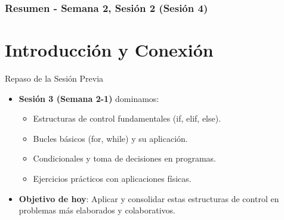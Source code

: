 \documentclass[10pt]{beamer}
\begin{document}
\myfront{}

\begin{frame}[plain]
  \titlepage
\end{frame}

\begin{frame}
  \frametitle{Resumen - Semana 2, Sesión 2 (Sesión 4)}
  \tableofcontents
\end{frame}


\section{Introducción y Conexión}

\begin{frame}{Repaso de la Sesión Previa}
  \begin{itemize}
    \item \textbf{Sesión 3 (Semana 2-1)} dominamos:
      \begin{itemize}
        \item Estructuras de control fundamentales (if, elif, else).
        \item Bucles básicos (for, while) y su aplicación.
        \item Condicionales y toma de decisiones en programas.
        \item Ejercicios prácticos con aplicaciones físicas.
      \end{itemize}
    \item \textbf{Objetivo de hoy}: Aplicar y consolidar estas estructuras de control en problemas más elaborados y colaborativos.
  \end{itemize}
\end{frame}
\end{document}
